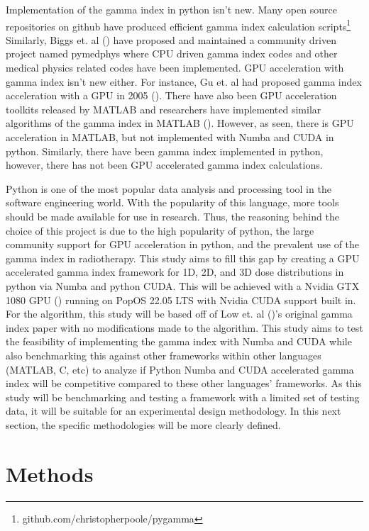 \documentclass[12pt]{article}
\begin{document}
Implementation of the gamma index in python isn’t new. Many open source repositories on github have produced efficient gamma index calculation scripts\footnote[1]{github.com/christopherpoole/pygamma} Similarly, Biggs et. al (\textcite{Biggs}) have proposed and maintained a community driven project named pymedphys where CPU driven gamma index codes and other medical physics related codes have been implemented. GPU acceleration with gamma index isn’t new either. For instance, Gu et. al had proposed gamma index acceleration with a GPU in 2005 (\textcite{Gu}). There have also been GPU acceleration toolkits released by MATLAB and researchers have implemented similar algorithms of the gamma index in MATLAB (\textcite{Matlab}). However, as seen, there is GPU acceleration in MATLAB, but not implemented with Numba and CUDA in python. Similarly, there have been gamma index implemented in python, however, there has not been GPU accelerated gamma index calculations.

Python is one of the most popular data analysis and processing tool in the software engineering world. With the popularity of this language, more tools should be made available for use in research. Thus, the reasoning behind the choice of this project is due to the high popularity of python, the large community support for GPU acceleration in python, and the prevalent use of the gamma index in radiotherapy. This study aims to fill this gap by creating a GPU accelerated gamma index framework for 1D, 2D, and 3D dose distributions in python via Numba and python CUDA. This will be achieved with a Nvidia GTX 1080 GPU (\textcite{NVidia}) running on PopOS 22.05 LTS with Nvidia CUDA support built in. For the algorithm, this study will be based off of Low et. al (\textcite{Low})’s original gamma index paper with no modifications made to the algorithm. This study aims to test the feasibility of implementing the gamma index with Numba and CUDA while also benchmarking this against other frameworks within other languages (MATLAB, C, etc) to analyze if Python Numba and CUDA accelerated gamma index will be competitive compared to these other languages’ frameworks. As this study will be benchmarking and testing a framework with a limited set of testing data, it will be suitable for an experimental design methodology. In this next section, the specific methodologies will be more clearly defined.

\section{Methods}
\end{document}
